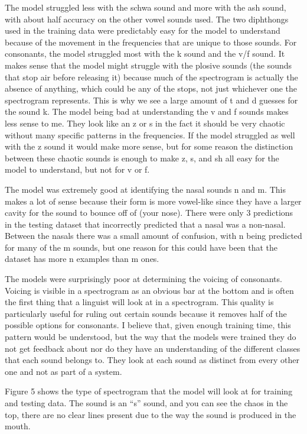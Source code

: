 \documentclass[10pt,twocolumn]{article}
\begin{document}
The model struggled less with the schwa sound and more with the ash sound, with about half accuracy on the other vowel sounds used. The two diphthongs used in the training data were predictably easy for the model to understand because of the movement in the frequencies that are unique to those sounds. 
For consonants, the model struggled most with the k sound and the v/f sound. It makes sense that the model might struggle with the plosive sounds (the sounds that stop air before releasing it) because much of the spectrogram is actually the absence of anything, which could be any of the stops, not just whichever one the spectrogram represents. This is why we see a large amount of t and d guesses for the sound k. The model being bad at understanding the v and f sounds makes less sense to me. They look like an z or s in the fact it should be very chaotic without many specific patterns in the frequencies. If the model struggled as well with the z sound it would make more sense, but for some reason the distinction between these chaotic sounds is enough to make z, s, and sh all easy for the model to understand, but not for v or f.



The model was extremely good at identifying the nasal sounds n and m. This makes a lot of sense because their form is more vowel-like since they have a larger cavity for the sound to bounce off of (your nose). There were only 3 predictions in the testing dataset that incorrectly predicted that a nasal was a non-nasal. Between the nasals there was a small amount of confusion, with n being predicted for many of the m sounds, but one reason for this could have been that the dataset has more n examples than m ones. 

The models were surprisingly poor at determining the voicing of consonants. Voicing is visible in a spectrogram as an obvious bar at the bottom and is often the first thing that a linguist will look at in a spectrogram. This quality is particularly useful for ruling out certain sounds because it removes half of the possible options for consonants. I believe that, given enough training time, this pattern would be understood, but the way that the models were trained they do not get feedback about nor do they have an understanding of the different classes that each sound belongs to. They look at each sound as distinct from every other one and not as part of a system. 



Figure 5 shows the type of spectrogram that the model will look at for training and testing data. The sound is an “s” sound, and you can see the chaos in the top, there are no clear lines present due to the way the sound is produced in the mouth. 
\end{document}
